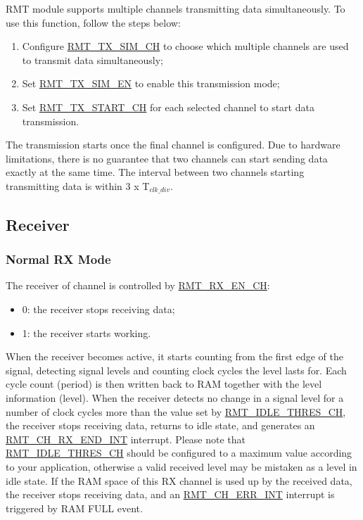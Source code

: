 \documentclass[main\_\_EN.tex]{subfiles}
\begin{document}
RMT module supports multiple channels transmitting data simultaneously. To use this function, follow the steps below:

\begin{enumerate}
    \item Configure \hyperref[regdesc:RMTTXSIMREG]{RMT\_TX\_SIM\_CH} to choose which multiple channels are used to transmit data simultaneously;
    \item Set \hyperref[fielddesc:RMTTXSIMEN]{RMT\_TX\_SIM\_EN} to enable this transmission mode;
    \item Set \hyperref[fielddesc:RMTTXSTARTCHN]{RMT\_TX\_START\_CH} for each selected channel to start data transmission.
\end{enumerate}

The transmission starts once the final channel is configured. Due to hardware limitations, there is no guarantee that two channels can start sending data exactly at the same time. The interval between two channels starting transmitting data is within 3 x T$_{clk\_div}$.


\subsection{Receiver}

\subsubsection{Normal RX Mode}\label{sec:normal-rx-mode}

The receiver of channel  is controlled by \hyperref[fielddesc:RMTRXENCHM]{RMT\_RX\_EN\_CH}: 
\begin{itemize}
    \item 0: the receiver stops receiving data;
    \item 1: the receiver starts working.
\end{itemize}

When the receiver becomes active, it starts counting from the first edge of the signal, detecting signal levels and counting clock cycles the level lasts for. Each cycle count (period) is then written back to RAM together with the level information (level). When the receiver detects no change in a signal level for a number of clock cycles more than the value set by \hyperref[fielddesc:RMTIDLETHRESCHM]{RMT\_IDLE\_THRES\_CH}, the receiver stops receiving data, returns to idle state, and generates an \hyperref[int:RMTCHnRXENDINT]{RMT\_CH\_RX\_END\_INT} interrupt. Please note that \hyperref[fielddesc:RMTIDLETHRESCHM]{RMT\_IDLE\_THRES\_CH} should be configured to a maximum value according to your application, otherwise a valid received level may be mistaken as a level in idle state. If the RAM space of this RX channel is used up by the received data, the receiver stops receiving data, and an \hyperref[int:RMTCHnERRINT]{RMT\_CH\_ERR\_INT} interrupt is triggered by RAM FULL event.
\end{document}
